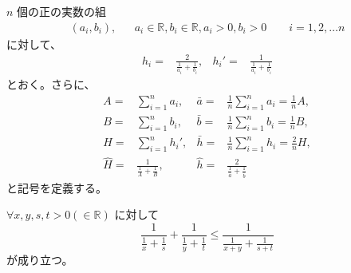 \documentclass[12pt]{jsarticle}
\def\arithmean#1{\bar{#1}}
\def\arithsum#1{#1}
\def\harmmean#1{\hat{#1}}
\def\harmformula#1#2#3{\frac{#1}{\frac{1}{#2} + \frac{1}{#3}}}
\begin{document}
\begin{definition}[記号]
$n$ 個の正の実数の組
\begin{align}
(a_i, b_i), && a_i \in \mathbb{R}, b_i \in \mathbb{R},
a_i > 0, b_i >0 \qquad i = 1, 2, \ldots n
\end{align}
に対して、
\begin{align}
h_i = & \harmformula{2}{a_i}{b_i},
& {h_i}' = & \harmformula{1}{a_i}{b_i}
\end{align}
とおく。さらに、
\begin{align}
\arithsum{A} = & \sum_{i=1}^{n} a_i,
& \arithmean{a} = &
\frac{1}{n} \sum_{i=1}^{n} a_i
= \frac{1}{n} A, \\
\arithsum{B} = & \sum_{i=1}^{n} b_i,
& \arithmean{b} = &
\frac{1}{n} \sum_{i=1}^{n} b_i
= \frac{1}{n} B, \\
\arithsum{H} = & \sum_{i=1}^{n} {h_i}',
& \arithmean{h} = &
\frac{1}{n} \sum_{i=1}^{n} h_i
= \frac{2}{n} H, \\
\harmmean{H} = & \harmformula{1}{A}{B},
& \harmmean{h} = & \harmformula{2}{\arithmean{a}}{\arithmean{b}}
\end{align}
と記号を定義する。
\end{definition}

\begin{lemma}
$\forall x, y, s, t > 0 (\in \mathbb{R})$ に対して
\begin{equation}
\harmformula{1}{x}{s} + \harmformula{1}{y}{t}
\le \harmformula{1}{x + y}{s + t}
\end{equation}
が成り立つ。
\end{lemma}
\end{document}

